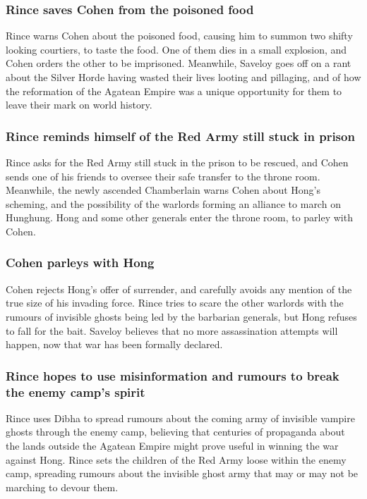 \subsubsection{\Gls{Rince} saves \Gls{Cohen} from the poisoned food}
\Gls{Rince} warns \Gls{Cohen} about the poisoned food, causing him to summon two shifty looking
courtiers, to taste the food. One of them dies in a small explosion, and \Gls{Cohen} orders the
other to be imprisoned. Meanwhile, \Gls{Saveloy} goes off on a rant about the Silver Horde having
wasted their lives looting and pillaging, and of how the reformation of the Agatean Empire was a
unique opportunity for them to leave their mark on world history.

\subsubsection{\Gls{Rince} reminds himself of the Red Army still stuck in prison}
\Gls{Rince} asks for the Red Army still stuck in the prison to be rescued, and \Gls{Cohen} sends one
of his friends to oversee their safe transfer to the throne room. Meanwhile, the newly ascended
Chamberlain warns \Gls{Cohen} about \Gls{Hong}'s scheming, and the possibility of the warlords
forming an alliance to march on Hunghung. \Gls{Hong} and some other generals enter the throne room,
to parley with \Gls{Cohen}.

\subsubsection{\Gls{Cohen} parleys with \Gls{Hong}}
\Gls{Cohen} rejects \Gls{Hong}'s offer of surrender, and carefully avoids any mention of the true
size of his invading force. \Gls{Rince} tries to scare the other warlords with the rumours of
invisible ghosts being led by the barbarian generals, but \Gls{Hong} refuses to fall for the bait.
\Gls{Saveloy} believes that no more assassination attempts will happen, now that war has been
formally declared.

\subsubsection{\Gls{Rince} hopes to use misinformation and rumours to break the enemy camp's spirit}
\Gls{Rince} uses \Gls{Dibha} to spread rumours about the coming army of invisible vampire ghosts
through the enemy camp, believing that centuries of propaganda about the lands outside the Agatean
Empire might prove useful in winning the war against \Gls{Hong}. \Gls{Rince} sets the children of
the Red Army loose within the enemy camp, spreading rumours about the invisible ghost army that
may or may not be marching to devour them.

